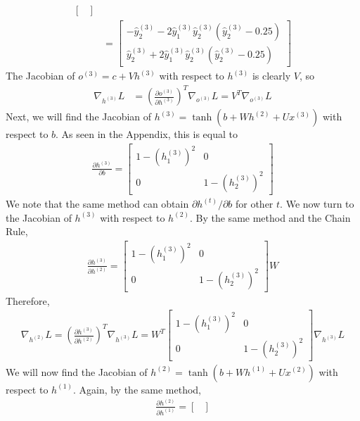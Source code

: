 \documentclass[
	12pt, %
]{../Template/fphw}
\begin{document}
\begin{enumerate}[label=(\arabic*)]
\begin{align}
\begin{bmatrix}
    \end{bmatrix} \\
    &  = \begin{bmatrix}
        -\hat{y}_{2}^{(3)}-2\hat{y}_{1}^{(3)}\hat{y}_{2}^{(3)}(\hat{y}_{2}^{(3)}-0.25)\\
        \hat{y}_{2}^{(3)} + 2\hat{y}_{1}^{(3)}\hat{y}_{2}^{(3)}(\hat{y}_{2}^{(3)}-0.25)
    \end{bmatrix}
\end{align}
    The Jacobian of $o^{(3)}=c+Vh^{(3)}$ with respect to $h^{(3)}$ is clearly $V$, so
    \begin{align}
        \nabla_{h^{(3)}}L &= \left(\frac{\partial o^{(3)}}{\partial h^{(3)}}\right)^T \nabla_{o^{(3)}} L = V^T \nabla_{o^{(3)}}L
    \end{align}
    Next, we will find the Jacobian of $h^{(3)} = \tanh(b+Wh^{(2)}+Ux^{(3)})$ with respect to $b$. As seen in the Appendix, this is equal to
    \begin{align}
        \frac{\partial h^{(3)}}{\partial b} = \begin{bmatrix}
            1-(h^{(3)}_{1})^2 & 0 \\ 0 & 1-(h^{(3)}_{2})^2 
        \end{bmatrix}
    \end{align}
    We note that the same method can obtain $\partial h^{(t)}/\partial b$ for other $t$. We now turn to the Jacobian of $h^{(3)}$ with respect to $h^{(2)}$. By the same method and the Chain Rule,
    \begin{align}
        \frac{\partial h^{(3)}}{\partial h^{(2)}} = \begin{bmatrix}
            1-(h^{(3)}_{1})^2 & 0 \\ 0 & 1-(h^{(3)}_{2})^2 
        \end{bmatrix}W
    \end{align}
    Therefore,
    \begin{align}
        \nabla_{h^{(2)}}L = \left(\frac{\partial h^{(3)}}{\partial h^{(2)}}\right)^T \nabla_{h^{(3)}}L = W^T\begin{bmatrix}
            1-(h^{(3)}_{1})^2 & 0 \\ 0 & 1-(h^{(3)}_{2})^2 
        \end{bmatrix} \nabla_{h^{(3)}}L
    \end{align}
    We will now find the Jacobian of $h^{(2)}= \tanh(b+Wh^{(1)}+Ux^{(2)})$ with respect to $h^{(1)}$. Again, by the same method,
    \begin{align}
        \frac{\partial h^{(2)}}{\partial h^{(1)}}=\begin{bmatrix}

\end{bmatrix}
\end{align}
\end{enumerate}
\end{document}
